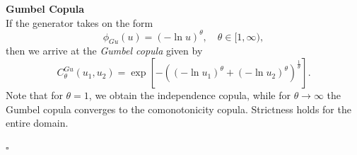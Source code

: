 \textbf{Gumbel Copula}\\
If the generator takes on the form
\begin{equation}
\phi_{G u}(u)=(-\ln u)^{\theta}, \quad \theta \in [1, \infty),
\end{equation}
then we arrive at the \textit{Gumbel copula} given by
\begin{equation}
C_{\theta}^{G u}\left(u_{1}, u_{2}\right)=\exp \left[-\left(\left(-\ln u_{1}\right)^{\theta}+\left(-\ln u_{2}\right)^{\theta}\right)^{\frac{1}{\theta}}\right].
\end{equation}
Note that for $\theta= 1$, we obtain the independence copula, while for $\theta \rightarrow \infty$ the Gumbel copula converges to the comonotonicity copula. Strictness holds for the entire domain.

\hfill $\square$ \\





